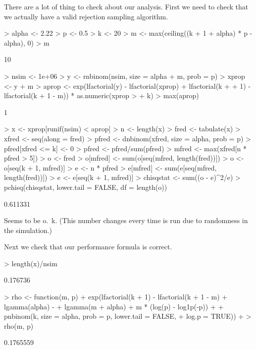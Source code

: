 \documentclass[11pt]{article}
\begin{document}
There are a lot of thing to check about our analysis.
First we need to check that we actually have a valid rejection sampling
algorithm.
\begin{Schunk}
\begin{Sinput}
> alpha <- 2.22
> p <- 0.5
> k <- 20
> m <- max(ceiling((k + 1 + alpha) * p - alpha), 0)
> m
\end{Sinput}
\begin{Soutput}
[1] 10
\end{Soutput}
\begin{Sinput}
> nsim <- 1e+06
> y <- rnbinom(nsim, size = alpha + m, prob = p)
> xprop <- y + m
> aprop <- exp(lfactorial(y) - lfactorial(xprop) + lfactorial(k + 
+     1) - lfactorial(k + 1 - m)) * as.numeric(xprop > 
+     k)
> max(aprop)
\end{Sinput}
\begin{Soutput}
[1] 1
\end{Soutput}
\begin{Sinput}
> x <- xprop[runif(nsim) < aprop]
> n <- length(x)
> fred <- tabulate(x)
> xfred <- seq(along = fred)
> pfred <- dnbinom(xfred, size = alpha, prob = p)
> pfred[xfred <= k] <- 0
> pfred <- pfred/sum(pfred)
> mfred <- max(xfred[n * pfred > 5])
> o <- fred
> o[mfred] <- sum(o[seq(mfred, length(fred))])
> o <- o[seq(k + 1, mfred)]
> e <- n * pfred
> e[mfred] <- sum(e[seq(mfred, length(fred))])
> e <- e[seq(k + 1, mfred)]
> chisqstat <- sum((o - e)^2/e)
> pchisq(chisqstat, lower.tail = FALSE, df = length(o))
\end{Sinput}
\begin{Soutput}
[1] 0.611331
\end{Soutput}
\end{Schunk}
Seems to be o.~k.  (This number changes every time \verb@Sweave@ is run
due to randomness in the simulation.)

Next we check that our performance formula is correct.
\begin{Schunk}
\begin{Sinput}
> length(x)/nsim
\end{Sinput}
\begin{Soutput}
[1] 0.176736
\end{Soutput}
\begin{Sinput}
> rho <- function(m, p) {
+     exp(lfactorial(k + 1) - lfactorial(k + 1 - m) + lgamma(alpha) - 
+         lgamma(m + alpha) + m * (log(p) - log1p(-p)) + 
+         pnbinom(k, size = alpha, prob = p, lower.tail = FALSE, 
+             log.p = TRUE))
+ }
> rho(m, p)
\end{Sinput}
\begin{Soutput}
[1] 0.1765559
\end{Soutput}
\end{Schunk}
\end{document}
